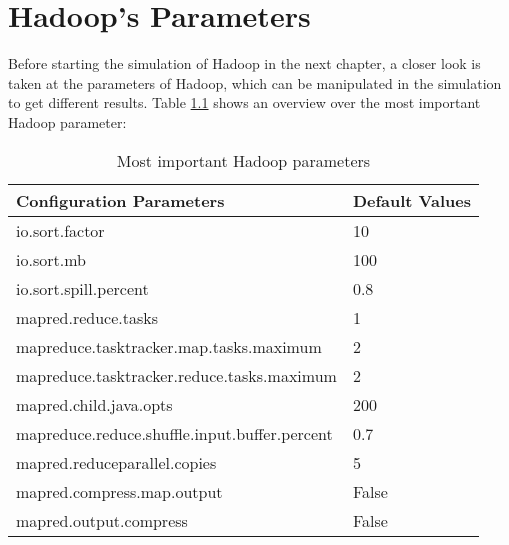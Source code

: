 \chapter{Hadoop's Parameters}
\label{params}
Before starting the simulation of Hadoop in the next chapter, a closer look is taken at the parameters of Hadoop, which can be manipulated in the simulation to get different results. Table \ref{parameters} shows an overview over the most important Hadoop parameter:
\begin{table}[H]
	\centering
	\label{parameters}
	\begin{tabular}{|l|l|}
		\hline
		\textbf{Configuration Parameters}             & \textbf{Default Values} \\ \hline
		io.sort.factor                                & 10                      \\ \hline
		io.sort.mb                                    & 100                     \\ \hline
		io.sort.spill.percent                         & 0.8                     \\ \hline
		mapred.reduce.tasks                           & 1                       \\ \hline
		mapreduce.tasktracker.map.tasks.maximum       & 2                       \\ \hline
		mapreduce.tasktracker.reduce.tasks.maximum    & 2                       \\ \hline
		mapred.child.java.opts                        & 200                     \\ \hline
		mapreduce.reduce.shuffle.input.buffer.percent & 0.7                     \\ \hline
		mapred.reduceparallel.copies                  & 5                       \\ \hline
		mapred.compress.map.output                    & False                   \\ \hline
		mapred.output.compress                        & False                   \\ \hline
	\end{tabular}
	\caption{Most important Hadoop parameters}
\end{table}


